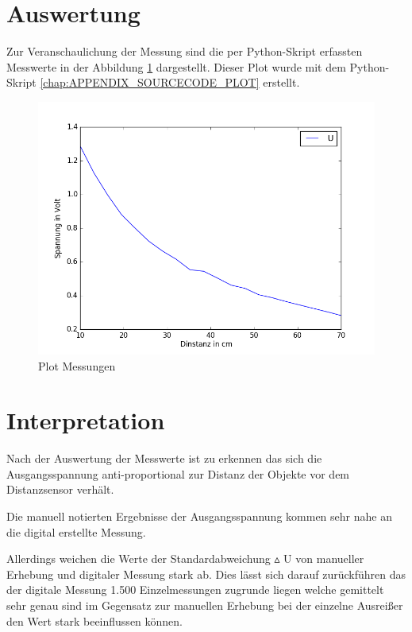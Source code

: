 \documentclass[12pt,oneside,a4paper]{report}
\begin{document}
\section{Auswertung}
\label{chap:VERSUCH_1_AUSWERTUNG}
Zur Veranschaulichung der Messung sind die per Python-Skript erfassten Messwerte in der Abbildung \ref{fig:VERSUCH_1_AUSWERTUNG_PLOT} dargestellt. Dieser Plot wurde mit dem Python-Skript \ref{chap:APPENDIX_SOURCECODE_PLOT} erstellt.

\begin{figure}[H]
	\centering\small
	\includegraphics[width=\textwidth]{media/plot_messungen_avg.png}
	\caption{Plot Messungen}
	\label{fig:VERSUCH_1_AUSWERTUNG_PLOT}
\end{figure}

\section{Interpretation}
\label{chap:VERSUCH_1_INTERPRETATION}
Nach der Auswertung der Messwerte ist zu erkennen das sich die Ausgangsspannung anti-proportional zur Distanz der Objekte vor dem Distanzsensor verhält.

Die manuell notierten Ergebnisse der Ausgangsspannung kommen sehr nahe an die digital erstellte Messung.

Allerdings weichen die Werte der Standardabweichung $\vartriangle$ U von manueller Erhebung und digitaler Messung stark ab. Dies lässt sich darauf zurückführen das der digitale Messung 1.500 Einzelmessungen zugrunde liegen welche gemittelt sehr genau sind im Gegensatz zur manuellen Erhebung bei der einzelne Ausreißer den Wert stark beeinflussen können.
\end{document}
